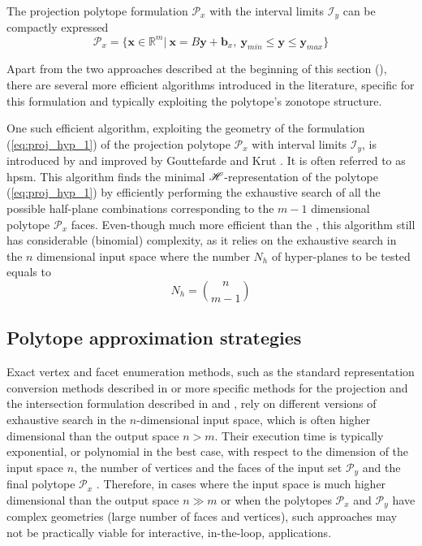The projection polytope formulation $\mathcal{P}_x$ with the interval limits $\mathcal{I}_y$ can be compactly expressed
\begin{equation}
    \mathcal{P}_x=\{\bm{x}\in\mathbb{R}^m |~ \bm{x} = B\bm{y} + \bm{b}_x,~\bm{y}_{min} \leq  \bm{y} \leq \bm{y}_{max}  \}
    \label{eq:proj_hyp_1}
\end{equation}

Apart from the two approaches described at the beginning of this section (), there are several more efficient algorithms introduced in the literature, specific for this formulation and typically exploiting the polytope's zonotope structure.

One such  efficient algorithm, exploiting the geometry of the formulation (\ref{eq:proj_hyp_1}) of the projection polytope $\mathcal{P}_x$ with interval limits $\mathcal{I}_y$, is introduced by \citet{Bouchard2009} and improved by Gouttefarde and Krut \cite{hyper_psm}. It is often referred to as \gls{hpsm}. This algorithm finds the minimal $\mathscr{H}$-representation of the polytope (\ref{eq:proj_hyp_1}) by efficiently performing the exhaustive search of all the possible half-plane combinations corresponding to the $m-1$ dimensional polytope $\mathcal{P}_x$ faces. Even-though much more efficient than the , this algorithm still has considerable (binomial) complexity, as it relies on the exhaustive search in the $n$ dimensional input space where the number $N_h$ of hyper-planes to be tested equals to 
$$N_h = \binom{n}{m-1}$$

\subsection{Polytope approximation strategies}
\label{ch:approximation_algos}

Exact vertex and facet enumeration methods, such as the standard representation conversion methods described in  or more specific methods for the projection and the intersection formulation described in  and , rely on different versions of exhaustive search in the $n$-dimensional input space, which is often higher dimensional than the output space $n> m$. Their execution time is typically exponential, or polynomial in the best case, with respect to the dimension of the input space $n$, the number of vertices and the faces of the input set $\mathcal{P}_y$ and the final polytope $\mathcal{P}_x$ \cite{Dyer1983}. Therefore, in cases where the input space is much higher dimensional than the output space $n\gg m$ or when the polytopes $\mathcal{P}_x$ and $\mathcal{P}_y$ have complex geometries (large number of faces and vertices), such approaches may not be practically viable for interactive, in-the-loop, applications. 

